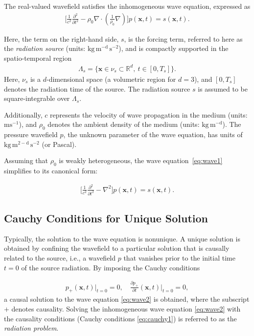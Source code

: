 \documentclass[11pt,reqno]{amsart}
\theoremstyle{remark}
\theoremstyle{italic_lemma}
\newcommand{\bx}{\boldsymbol{x}}
\begin{document}
\noindent
The real-valued wavefield satisfies the inhomogeneous wave equation, expressed as
\begin{align}  \label{eq:wave1}
   \bigg[\frac{1}{c^2}\frac{\partial^2}{\partial t^2} - \rho_0 \nabla \cdot \left( \frac{1}{\rho_0} \nabla \right)  \bigg] p(\bx, t)   = s(\bx,t).
\end{align}

\noindent
Here, the term on the right-hand side, $s$, is the forcing term, referred to here as the \textit{radiation source} (units: $\mathrm{kg} \, \mathrm{m}^{-\mathrm{d}} \, \mathrm{s}^{-2}$), and
is compactly supported in the spatio-temporal region 
\begin{align}  \label{eq:source-support}
    \Lambda_s = \{ \bx \in \nu_s \subset \mathbb{R}^d, \ t \in 
[ 0,T_s] \}.
\end{align}
Here, $\nu_s$ is a $d$-dimensional space (a volumetric region for $d=3$), and $[ 0, T_s]$ denotes the radiation time of the source. The radiation source $s$ is assumed to be square-integrable over $\Lambda_s$. 

\noindent
Additionally, $c$ represents the velocity of wave propagation in the medium (units: $\mathrm{ms}^{-1}$), and $\rho_0$ denotes the ambient density of the medium (units: $\mathrm{kg} \, \mathrm{m}^{-\mathrm{d}}$). The pressure wavefield $p$, the unknown parameter of the wave equation, has units of $\mathrm{kg} \, \mathrm{m}^{2-\mathrm{d}} \, \mathrm{s}^{-2}$ (or Pascal). 

\noindent
Assuming that \( \rho_0 \) is weakly heterogeneous, the wave equation~\eqref{eq:wave1} simplifies to its canonical form:


\begin{align}  \label{eq:wave2}
    \bigg[  \frac{1}{c^2} \frac{\partial^2 }{\partial t^2} - \nabla^2 \bigg] p(\bx, t) = s(\bx, t).
\end{align}


\subsection{Cauchy Conditions for Unique Solution}
Typically, the solution to the wave equation is nonunique. A unique solution is obtained by confining the wavefield to a particular solution that is causally related to the source, i.e., a wavefield $p$ that vanishes prior to the initial time $t=0$ of the source radiation. By imposing the Cauchy conditions

\begin{align}  \label{eq:cauchy1}
    p_+(\bx, t) \big|_{t=0} = 0, \quad 
    \frac{\partial p_+}{\partial t} (\bx, t) \big|_{t=0} = 0,
\end{align}
\noindent
a causal solution to the wave equation \eqref{eq:wave2} is obtained, where the subscript $+$ denotes causality. Solving the inhomogeneous wave equation \eqref{eq:wave2} with the causality conditions (Cauchy conditions \eqref{eq:cauchy1}) is referred to as the \textit{radiation problem}. 
\end{document}
